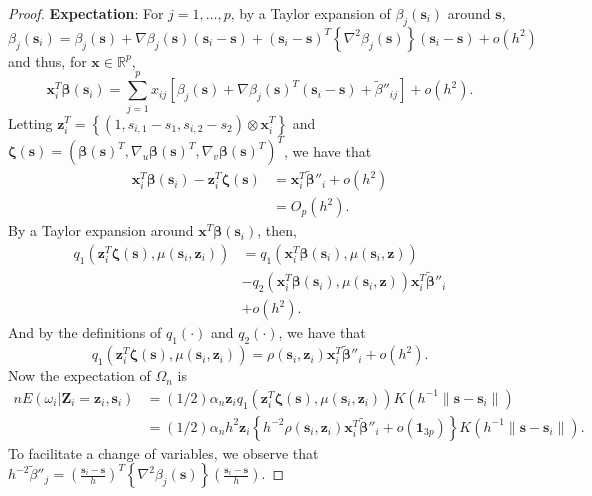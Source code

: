 \documentclass[authoryear,review, 12pt]{elsarticle}
\begin{document}
\begin{proof}
\textbf{Expectation}: For $j=1,\dots,p$, by a Taylor expansion of
$\beta_{j}(\bm{s}_{i})$ around $\bm{s}$,
\[
\beta_{j}(\bm{s}_{i})=\beta_{j}(\bm{s})+\nabla\beta_{j}(\bm{s})(\bm{s}_{i}-\bm{s})+(\bm{s}_{i}-\bm{s})^{T}\left\{ \nabla^{2}\beta_{j}(\bm{s})\right\} (\bm{s}_{i}-\bm{s})+o\left(h^{2}\right)
\]
and thus, for $\bm{x}\in\mathbb{R}^{p}$, 
\[
\bm{x}_{i}^{T}\bm{\beta}\!\left(\bm{s}_{i}\right)=\sum_{j=1}^{p}x_{ij}\left[\beta_{j}(\bm{s})+\nabla\beta_{j}(\bm{s})^{T}(\bm{s}_{i}-\bm{s})+\tilde{\beta}''_{ij}\right]+o\left(h^{2}\right).
\]
Letting $\bm{z}_{i}^{T}=\left\{ \left(1,s_{i,1}-s_{1},s_{i,2}-s_{2}\right)\otimes\bm{x}_{i}^{T}\right\} $
and $\bm{\zeta}(\bm{s})=\left(\bm{\beta}(\bm{s})^{T},\nabla_{u}\bm{\beta}(\bm{s})^{T},\nabla_{v}\bm{\beta}(\bm{s})^{T}\right)^{T}$,
we have that 
\begin{align*}
\bm{x}_{i}^{T}\bm{\beta}(\bm{s}_{i})-\bm{z}_{i}^{T}\bm{\zeta}(\bm{s}) &= \bm{x}_{i}^{T}\tilde{\bm{\beta}}''_{i}+o\left(h^{2}\right)\\
&= O_{p}\left(h^{2}\right).
\end{align*}
By a Taylor expansion around $\bm{x}^{T}\bm{\beta}(\bm{s}_{i})$,
then, 
\begin{align*}
q_{1}\left(\bm{z}_{i}^{T}\bm{\zeta}(\bm{s}),\mu(\bm{s}_{i},\bm{z}_{i})\right) &= q_{1}\left(\bm{x}_{i}^{T}\bm{\beta}(\bm{s}_{i}),\mu(\bm{s}_{i},\bm{z})\right)\\
 & -q_{2}\left(\bm{x}_{i}^{T}\bm{\beta}(\bm{s}_{i}),\mu(\bm{s}_{i},\bm{z})\right)\bm{x}_{i}^{T}\tilde{\bm{\beta}}''_{i}\\
 & +o\left(h^{2}\right).
\end{align*}
And by the definitions of $q_{1}(\cdot)$ and $q_{2}(\cdot)$, we
have that
\[
q_{1}\left(\bm{z}_{i}^{T}\bm{\zeta}(\bm{s}),\mu(\bm{s}_{i},\bm{z}_{i})\right)=\rho(\bm{s}_{i},\bm{z}_{i})\bm{x}_{i}^{T}\tilde{\bm{\beta}}''_{i}+o\left(h^{2}\right).
\]
Now the expectation of $\Omega_{n}$ is 
\begin{align*}
nE\left(\omega_{i}|\bm{Z}_{i}=\bm{z}_{i},\bm{s}_{i}\right) &= \left(1/2\right)\alpha_{n}\bm{z}_{i}q_{1}\left(\bm{z}_{i}^{T}\bm{\zeta}(\bm{s}),\mu(\bm{s}_{i},\bm{z}_{i})\right)K\left(h^{-1}\|\bm{s}-\bm{s}_{i}\|\right)\\
&= \left(1/2\right)\alpha_{n}h^{2}\bm{z}_{i}\left\{ h^{-2}\rho(\bm{s}_{i},\bm{z}_{i})\bm{x}_{i}^{T}\tilde{\bm{\beta}}''_{i}+o\left(\bm{1}_{3p}\right)\right\} K\left(h^{-1}\|\bm{s}-\bm{s}_{i}\|\right).
\end{align*}
To facilitate a change of variables, we observe that $h^{-2}\tilde{\beta}''_{j}=\left(\frac{\bm{s}_{i}-\bm{s}}{h}\right)^{T}\left\{ \nabla^{2}\beta_{j}(\bm{s})\right\} \left(\frac{\bm{s}_{i}-\bm{s}}{h}\right)$.

\end{proof}
\end{document}
